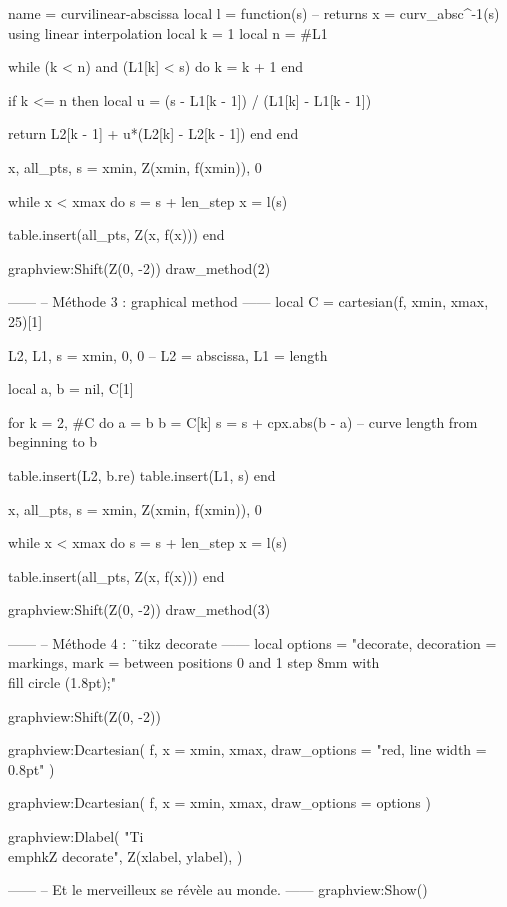 \documentclass{standalone}
\begin{document}
\begin{luadraw}{name = curvilinear-abscissa}
local l = function(s) -- returns x = curv_absc^{-1}(s) using linear interpolation
  local k = 1
  local n = #L1

  while (k < n) and (L1[k] < s) do
    k = k + 1
  end

  if k <= n then
    local u = (s - L1[k - 1]) / (L1[k] - L1[k - 1])

    return L2[k - 1] + u*(L2[k] - L2[k - 1])
  end
end

x, all_pts, s = xmin, {Z(xmin, f(xmin))}, 0

while x < xmax do
  s = s + len_step
  x = l(s)

  table.insert(all_pts, Z(x, f(x)))
end

graphview:Shift(Z(0, -2))
draw_method(2)

------
-- Méthode 3 : graphical method
------
local C = cartesian(f, xmin, xmax, 25)[1]

L2, L1, s = {xmin}, {0}, 0 -- L2 = abscissa, L1 = length

local a, b = nil, C[1]

for k = 2, #C do
  a = b
  b = C[k]
  s = s + cpx.abs(b - a) -- curve length from beginning to b

  table.insert(L2, b.re)
  table.insert(L1, s)
end

x, all_pts, s = xmin, {Z(xmin, f(xmin))}, 0

while x < xmax do
  s = s + len_step
  x = l(s)

  table.insert(all_pts, Z(x, f(x)))
end

graphview:Shift(Z(0, -2))
draw_method(3)

------
-- Méthode 4 : ¨tikz decorate
------
local options = "decorate, decoration = {markings, mark = between positions 0 and 1 step 8mm with {\\fill circle (1.8pt);}}"

graphview:Shift(Z(0, -2))

graphview:Dcartesian(
  f,
  {
    x = {xmin, xmax},
    draw_options = "red, line width = 0.8pt"
  }
)

graphview:Dcartesian(
  f,
  {
    x = {xmin, xmax},
    draw_options = options
  }
)

graphview:Dlabel(
  "Ti\\emph{k}Z decorate", Z(xlabel, ylabel), {}
)

------
-- Et le merveilleux se révèle au monde.
------
graphview:Show()
\end{luadraw}
\end{document}
